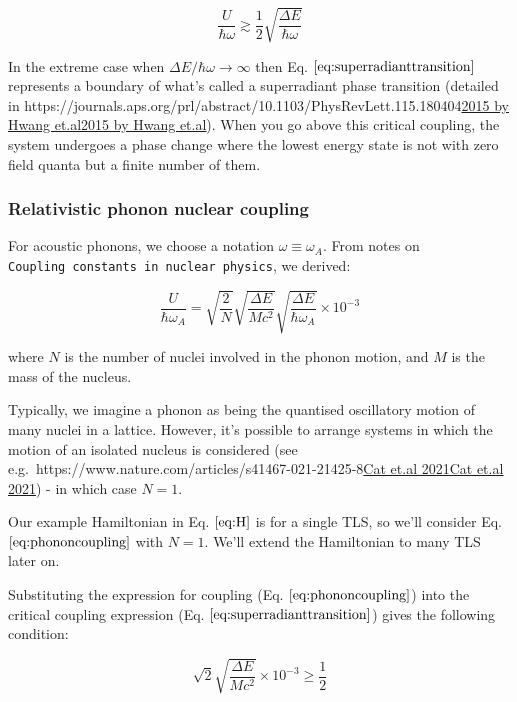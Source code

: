 \documentclass[
]{article}
\let\oldhref\href
\renewcommand{\href}[2]{\ifx#1\urlprefix\oldhref{#1}{#2}\else\uline{\oldhref{#1}{#2}}\fi}
\renewcommand{\[}{\begin{equation}}
\renewcommand{\]}{\end{equation}}
\begin{document}
\[
\frac{U}{\hbar\omega} \gtrsim \frac{1}{2}\sqrt{\frac{\Delta E}{\hbar\omega}}
\label{eq:superradianttransition}
\]

In the extreme case when \(\Delta E/\hbar\omega \rightarrow \infty\)
then Eq. \(\ref{eq:superradianttransition}\) represents a boundary of
what's called a superradiant phase transition (detailed in
\href{https://journals.aps.org/prl/abstract/10.1103/PhysRevLett.115.180404}{2015
by Hwang et.al}). When you go above this critical coupling, the system
undergoes a phase change where the lowest energy state is not with zero
field quanta but a finite number of them.

\subsubsection{Relativistic phonon nuclear
coupling}\label{relativistic-phonon-nuclear-coupling}

For acoustic phonons, we choose a notation \(\omega \equiv \omega_A\).
From notes on \texttt{Coupling\ constants\ in\ nuclear\ physics}, we
derived:

\[
\frac{U}{\hbar \omega_A} = \sqrt{\frac{2}{N}} \sqrt{\frac{\Delta E}{M c^2}} \sqrt{\frac{\Delta E}{\hbar \omega_A}} \times 10^{-3}
\label{eq:phononcoupling}
\]

where \(N\) is the number of nuclei involved in the phonon motion, and
\(M\) is the mass of the nucleus.

Typically, we imagine a phonon as being the quantised oscillatory motion
of many nuclei in a lattice. However, it's possible to arrange systems
in which the motion of an isolated nucleus is considered (see
e.g.~\href{https://www.nature.com/articles/s41467-021-21425-8}{Cat et.al
2021}) - in which case \(N=1\).

Our example Hamiltonian in Eq. \(\ref{eq:H}\) is for a single TLS, so
we'll consider Eq. \(\ref{eq:phononcoupling}\) with \(N=1\). We'll
extend the Hamiltonian to many TLS later on.

Substituting the expression for coupling (Eq.
\(\ref{eq:phononcoupling}\)) into the critical coupling expression (Eq.
\(\ref{eq:superradianttransition}\)) gives the following condition:

\[
\sqrt{2} \sqrt{\frac{\Delta E}{M c^2}}  \times 10^{-3} \ge \frac{1}{2}
\]

\printbibliography
\end{document}

